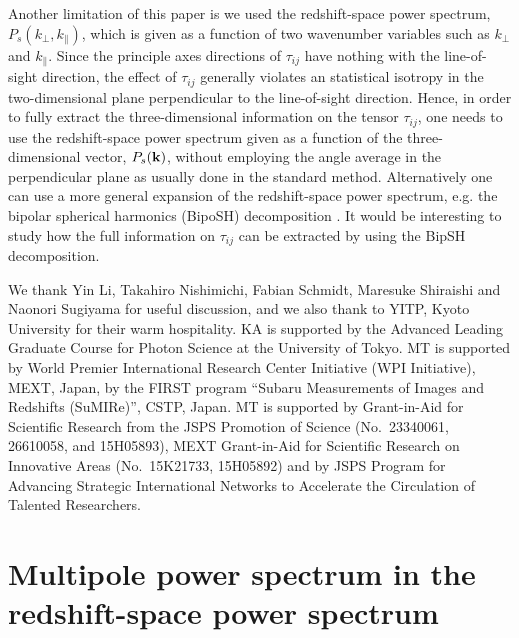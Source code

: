 \documentclass[prd,onecolumn,notitlepage,amsmath,amssymb,floatfix,superscriptaddress]{revtex4-1}
\newcommand{\bk}{{\bf k}}
\begin{document}
Another limitation of this paper is we used the redshift-space power spectrum, $P_s(k_\perp,k_\parallel)$,
which is given as a function of two wavenumber variables such as $k_\perp$ and $k_\parallel$. 
Since the principle axes directions of $\tau_{ij}$ have nothing with the line-of-sight direction, the effect of $\tau_{ij}$ generally violates an statistical isotropy in the two-dimensional plane perpendicular to the line-of-sight direction. Hence, in order to fully extract 
the three-dimensional information on the tensor $\tau_{ij}$, one needs to use
 the redshift-space power spectrum given as a function of the three-dimensional vector, $P_s(\bk)$, without employing the angle average in the perpendicular plane as usually done in the standard method. Alternatively
one can use a more general expansion of the redshift-space power spectrum, e.g. the bipolar spherical harmonics (BipoSH) decomposition \cite{Shiraishietal:17}. It would be interesting to study how the full information on $\tau_{ij}$ can be extracted by using the BipSH decomposition. 

 We thank Yin Li, Takahiro Nishimichi, Fabian Schmidt,
Maresuke Shiraishi and Naonori Sugiyama for useful discussion, and we
also thank to YITP, Kyoto University for their warm hospitality. KA is
supported by the Advanced Leading Graduate Course for Photon Science at
the University of Tokyo. MT is supported by World Premier International
Research Center Initiative (WPI Initiative), MEXT, Japan, by the FIRST
program ``Subaru Measurements of Images and Redshifts (SuMIRe)'', CSTP,
Japan. MT is supported by Grant-in-Aid for Scientific Research from the
JSPS Promotion of Science (No.~23340061, 26610058, and 15H05893), MEXT Grant-in-Aid
for Scientific Research on Innovative Areas (No.~15K21733,
15H05892) and by JSPS Program for Advancing Strategic International
Networks to Accelerate the Circulation of Talented Researchers.


\appendix
\section{Multipole power spectrum in the redshift-space power spectrum}
\label{app:multipole}
\end{document}
